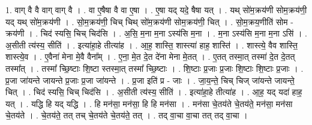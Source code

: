 \documentclass[17pt]{extarticle}
\begin{document}
1. वाग् वै वै वाग् वाग् वै । . वा ए॒षैषा वै वा ए॒षा । . ए॒षा यद् यदे॒ षैषा यत् । . यथ् सो॑म॒क्रय॑णी सोम॒क्रय॑णी॒ यद् यथ् सो॑म॒क्रय॑णी । . सो॒म॒क्रय॑णी॒ चिच् चिथ् सो॑म॒क्रय॑णी सोम॒क्रय॑णी॒ चित् । . सो॒म॒क्रय॒णीति॑ सोम - क्रय॑णी । . चिद॑ स्यसि॒ चिच् चिद॑सि । . अ॒सि॒ म॒ना म॒ना ऽस्य॑सि म॒ना । . म॒ना ऽस्य॑सि म॒ना म॒ना ऽसि॑ । . अ॒सीती त्य॑स्य॒ सीति॑ । . इत्या॑हा॒हे तीत्या॑ह । . आ॒ह॒ शास्ति॒ शास्त्या॑ हाह॒ शास्ति॑ । . शास्त्ये॒ वैव शास्ति॒ शास्त्ये॒व । . ए॒वैना॑ मेना मे॒वै वैना᳚म् । . ए॒ना॒ मे॒त दे॒त दे॑ना मेना मे॒तत् । . ए॒तत् तस्मा॒त् तस्मा॑ दे॒त दे॒तत् तस्मा᳚त् । . तस्मा᳚ च्छि॒ष्टाः शि॒ष्टा स्तस्मा॒त् तस्मा᳚ च्छि॒ष्टाः । . शि॒ष्टाः प्र॒जाः प्र॒जाः शि॒ष्टाः शि॒ष्टाः प्र॒जाः । . प्र॒जा जा॑यन्ते जायन्ते प्र॒जाः प्र॒जा जा॑यन्ते । . प्र॒जा इति॑ प्र - जाः । . जा॒य॒न्ते॒ चिच् चिज् जा॑यन्ते जायन्ते॒ चित् । . चिद॑ स्यसि॒ चिच् चिद॑सि । . अ॒सीती त्य॑स्य॒ सीति॑ । . इत्या॑हा॒हे तीत्या॑ह । . आ॒ह॒ यद् यदा॑ हाह॒ यत् । . यद्धि हि यद् यद्धि । . हि मन॑सा॒ मन॑सा॒ हि हि मन॑सा । . मन॑सा चे॒तय॑ते चे॒तय॑ते॒ मन॑सा॒ मन॑सा चे॒तय॑ते । . चे॒तय॑ते॒ तत् तच् चे॒तय॑ते चे॒तय॑ते॒ तत् । . तद् वा॒चा वा॒चा तत् तद् वा॒चा । \newline
\end{document}
